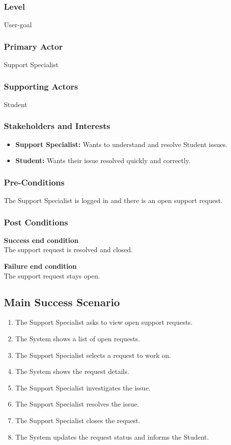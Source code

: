 \documentclass[10pt,letterpaper]{article}
\begin{document}
\subsubsection*{Level}
User-goal

\subsubsection*{Primary Actor}
Support Specialist

\subsubsection*{Supporting Actors}
Student

\subsubsection*{Stakeholders and Interests}
\begin{itemize}
    \item \textbf{Support Specialist:} Wants to understand and resolve Student issues.
    \item \textbf{Student:} Wants their issue resolved quickly and correctly.
\end{itemize}

\subsubsection*{Pre-Conditions}
The Support Specialist is logged in and there is an open support request.

\subsubsection*{Post Conditions}

\textbf{Success end condition}\\
The support request is resolved and closed.

\textbf{Failure end condition}\\
The support request stays open.

\subsection*{Main Success Scenario}
\begin{enumerate}
    \item The Support Specialist asks to view open support requests.
    \item The System shows a list of open requests.
    \item The Support Specialist selects a request to work on.
    \item The System shows the request details.
    \item The Support Specialist investigates the issue.
    \item The Support Specialist resolves the issue.
    \item The Support Specialist closes the request.
    \item The System updates the request status and informs the Student.
\end{enumerate}
\end{document}
